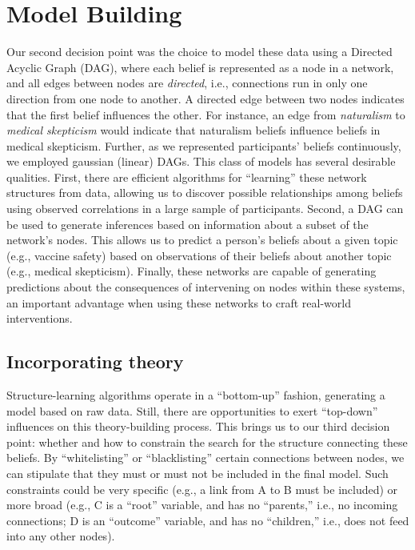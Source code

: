 \documentclass[10pt, letterpaper]{article}
\begin{document}
\section{Model Building}\label{model-building}

Our second decision point was the choice to model these data using a
Directed Acyclic Graph (DAG), where each belief is represented as a node
in a network, and all edges between nodes are \emph{directed}, i.e.,
connections run in only one direction from one node to another. A
directed edge between two nodes indicates that the first belief
influences the other. For instance, an edge from \emph{naturalism} to
\emph{medical skepticism} would indicate that naturalism beliefs
influence beliefs in medical skepticism. Further, as we represented
participants' beliefs continuously, we employed gaussian (linear) DAGs.
This class of models has several desirable qualities. First, there are
efficient algorithms for ``learning'' these network structures from
data, allowing us to discover possible relationships among beliefs using
observed correlations in a large sample of participants. Second, a DAG
can be used to generate inferences based on information about a subset
of the network's nodes. This allows us to predict a person's beliefs
about a given topic (e.g., vaccine safety) based on observations of
their beliefs about another topic (e.g., medical skepticism). Finally,
these networks are capable of generating predictions about the
consequences of intervening on nodes within these systems, an important
advantage when using these networks to craft real-world interventions.

\subsection{Incorporating theory}\label{incorporating-theory}

Structure-learning algorithms operate in a ``bottom-up'' fashion,
generating a model based on raw data. Still, there are opportunities to
exert ``top-down'' influences on this theory-building process. This
brings us to our third decision point: whether and how to constrain the
search for the structure connecting these beliefs. By ``whitelisting''
or ``blacklisting'' certain connections between nodes, we can stipulate
that they must or must not be included in the final model. Such
constraints could be very specific (e.g., a link from A to B must be
included) or more broad (e.g., C is a ``root'' variable, and has no
``parents,'' i.e., no incoming connections; D is an ``outcome''
variable, and has no ``children,'' i.e., does not feed into any other
nodes).
\end{document}
